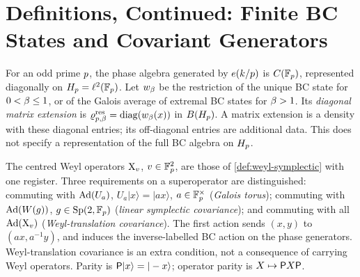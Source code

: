 
\section{Definitions, Continued: Finite BC States and Covariant Generators}
\label{sec:definitions-symmetry}

\begin{definition}
\label{def:bc-finite-phase}
For an odd prime $p$, the phase algebra generated by $e(k/p)$ is
$C(\mathbb F_{p})$, represented diagonally on $H_{p}=\ell^2(\mathbb F_{p})$.
Let $w_{\beta}$ be the restriction of the unique BC state for
$0<\beta\le1$, or of the Galois average of extremal BC states for
$\beta>1$. Its \emph{diagonal matrix extension} is
$\varrho^{\mathrm{res}}_{p,\beta}=\operatorname{diag}(w_{\beta}(x))$ in $B(H_{p})$.
A matrix extension is a density with these diagonal entries; its
off-diagonal entries are additional data. This does not specify a
representation of the full BC algebra on $H_{p}$.
\end{definition}

\begin{definition}
\label{def:finite-arithmetic-covariance}
The centred Weyl operators $\mathrm{X}_{v}$, $v\in\mathbb F_{p}^2$, are those of
\cref{def:weyl-symplectic} with one register. Three requirements on a
superoperator are distinguished: commuting with $\operatorname{Ad}(U_a)$,
$U_a|x\rangle=|ax\rangle$, $a\in\mathbb F_{p}^{\times}$ (\emph{Galois torus});
commuting with $\operatorname{Ad}(W(g))$, $g\in\mathrm{Sp}(2,\mathbb F_{p})$
(\emph{linear symplectic covariance}); and commuting with all
$\operatorname{Ad}(\mathrm{X}_{v})$ (\emph{Weyl-translation covariance}). The first action sends
$(x,y)$ to $(ax,a^{-1}y)$, and induces the inverse-labelled BC action on
the phase generators. Weyl-translation covariance is an extra condition,
not a consequence of carrying Weyl operators. Parity is
$\mathsf P|x\rangle=|-x\rangle$; operator parity is $X\mapsto\mathsf P X\mathsf P$.
\end{definition}

